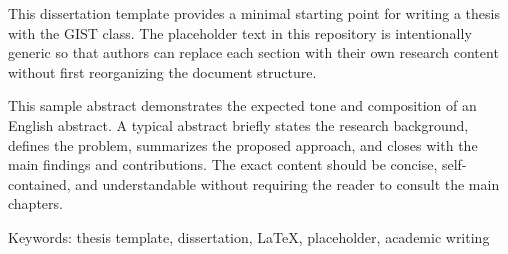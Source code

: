 This dissertation template provides a minimal starting point for writing a thesis with the GIST class. The placeholder text in this repository is intentionally generic so that authors can replace each section with their own research content without first reorganizing the document structure.

This sample abstract demonstrates the expected tone and composition of an English abstract. A typical abstract briefly states the research background, defines the problem, summarizes the proposed approach, and closes with the main findings and contributions. The exact content should be concise, self-contained, and understandable without requiring the reader to consult the main chapters.

Keywords: thesis template, dissertation, LaTeX, placeholder, academic writing
